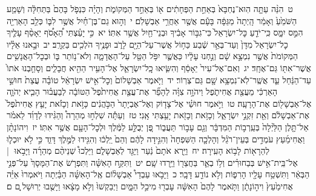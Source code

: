 \documentclass[18pt]{article}
\newcommand{\kri}[1]{\Afootnote{#1}}	%
\begin{document}
 {\loc ט~}הִנֵּ֨ה עַתָּ֤ה הֽוּא־נֶחְבָּא֙ בְּאַחַ֣ת הַפְּחָתִ֔ים א֖וֹ בְּאַחַ֣ד הַמְּקוֹמֹ֑ת וְהָיָ֗ה כִּנְפֹ֤ל בָּהֶם֙ בַּתְּחִלָּ֔ה וְשָׁמַ֤ע הַשֹּׁמֵ֙עַ֙ וְאָמַ֔ר הָֽיְתָה֙ מַגֵּפָ֔ה בָּעָ֕ם אֲשֶׁ֖ר אַחֲרֵ֥י אַבְשָׁלֹֽם׃ \startlock
 {\loc י~}וְה֣וּא גַם־בֶּן־חַ֗יִל אֲשֶׁ֥ר לִבּ֛וֹ כְּלֵ֥ב הָאַרְיֵ֖ה הִמֵּ֣ס יִמָּ֑ס כִּֽי־יֹדֵ֤עַ כׇּל־יִשְׂרָאֵל֙ כִּי־גִבּ֣וֹר אָבִ֔יךָ וּבְנֵי־חַ֖יִל אֲשֶׁ֥ר אִתּֽוֹ׃ \startlock
 {\loc יא~}כִּ֣י יָעַ֗צְתִּי הֵ֠אָסֹ֠ף יֵאָסֵ֨ף עָלֶ֤יךָ כׇל־יִשְׂרָאֵל֙ מִדָּן֙ וְעַד־בְּאֵ֣ר שֶׁ֔בַע כַּח֥וֹל אֲשֶׁר־עַל־הַיָּ֖ם לָרֹ֑ב וּפָנֶ֥יךָ הֹלְכִ֖ים בַּקְרָֽב׃ \startlock
 {\loc יב~}וּבָ֣אנוּ אֵלָ֗יו  \edtext{(באחת)}{\kri{קרי: בְּאַחַ֤ד}}  הַמְּקוֹמֹת֙ אֲשֶׁ֣ר נִמְצָ֣א שָׁ֔ם וְנַ֣חְנוּ עָלָ֔יו כַּאֲשֶׁ֛ר יִפֹּ֥ל הַטַּ֖ל עַל־הָאֲדָמָ֑ה וְלֹא־נ֥וֹתַר בּ֛וֹ וּבְכׇל־הָאֲנָשִׁ֥ים אֲשֶׁר־אִתּ֖וֹ גַּם־אֶחָֽד׃ \startlock
 {\loc יג~}וְאִם־אֶל־עִיר֙ יֵאָסֵ֔ף וְהִשִּׂ֧יאוּ כׇֽל־יִשְׂרָאֵ֛ל אֶל־הָעִ֥יר הַהִ֖יא חֲבָלִ֑ים וְסָחַ֤בְנוּ אֹתוֹ֙ עַד־הַנַּ֔חַל עַ֛ד אֲשֶֽׁר־לֹֽא־נִמְצָ֥א שָׁ֖ם גַּם־צְרֽוֹר׃ \startlock
 {\loc יד~}וַיֹּ֤אמֶר אַבְשָׁלוֹם֙ וְכׇל־אִ֣ישׁ יִשְׂרָאֵ֔ל טוֹבָ֗ה עֲצַת֙ חוּשַׁ֣י הָאַרְכִּ֔י מֵעֲצַ֖ת אֲחִיתֹ֑פֶל \edtext{{ס}    }{\kri{פסקא באמצע פסוק}שמואל ב יז יד} וַיהֹוָ֣ה צִוָּ֗ה לְהָפֵ֞ר אֶת־עֲצַ֤ת אֲחִיתֹ֙פֶל֙ הַטּוֹבָ֔ה לְבַעֲב֗וּר הָבִ֧יא יְהֹוָ֛ה אֶל־אַבְשָׁל֖וֹם אֶת־הָרָעָֽה׃ \startlock
 {\loc טו~}וַיֹּ֣אמֶר חוּשַׁ֗י אֶל־צָד֤וֹק וְאֶל־אֶבְיָתָר֙ הַכֹּ֣הֲנִ֔ים כָּזֹ֣את וְכָזֹ֗את יָעַ֤ץ אֲחִיתֹ֙פֶל֙ אֶת־אַבְשָׁלֹ֔ם וְאֵ֖ת זִקְנֵ֣י יִשְׂרָאֵ֑ל וְכָזֹ֥את וְכָזֹ֖את יָעַ֥צְתִּי אָֽנִי׃ \startlock
 {\loc טז~}וְעַתָּ֡ה שִׁלְח֣וּ מְהֵרָה֩ וְהַגִּ֨ידוּ לְדָוִ֜ד לֵאמֹ֗ר אַל־תָּ֤לֶן הַלַּ֙יְלָה֙ בְּעַֽרְב֣וֹת הַמִּדְבָּ֔ר וְגַ֖ם עָב֣וֹר תַּעֲב֑וֹר פֶּ֚ן יְבֻלַּ֣ע לַמֶּ֔לֶךְ וּלְכׇל־הָעָ֖ם אֲשֶׁ֥ר אִתּֽוֹ׃ \startlock
 {\loc יז~}וִיהוֹנָתָ֨ן וַאֲחִימַ֜עַץ עֹמְדִ֣ים בְּעֵין־רֹגֵ֗ל וְהָלְכָ֤ה הַשִּׁפְחָה֙ וְהִגִּ֣ידָה לָהֶ֔ם וְהֵם֙ יֵֽלְכ֔וּ וְהִגִּ֖ידוּ לַמֶּ֣לֶךְ דָּוִ֑ד כִּ֣י לֹ֥א יוּכְל֛וּ לְהֵרָא֖וֹת לָב֥וֹא הָעִֽירָה׃ \startlock
 {\loc יח~}וַיַּ֤רְא אֹתָם֙ נַ֔עַר וַיַּגֵּ֖ד לְאַבְשָׁלֹ֑ם וַיֵּלְכוּ֩ שְׁנֵיהֶ֨ם מְהֵרָ֜ה וַיָּבֹ֣אוּ  |  אֶל־בֵּֽית־אִ֣ישׁ בְּבַחוּרִ֗ים וְל֥וֹ בְאֵ֛ר בַּחֲצֵר֖וֹ וַיֵּ֥רְדוּ שָֽׁם׃ \startlock
 {\loc יט~}וַתִּקַּ֣ח הָאִשָּׁ֗ה וַתִּפְרֹ֤שׂ אֶת־הַמָּסָךְ֙ עַל־פְּנֵ֣י הַבְּאֵ֔ר וַתִּשְׁטַ֥ח עָלָ֖יו הָרִפ֑וֹת וְלֹ֥א נוֹדַ֖ע דָּבָֽר׃ \startlock
 {\loc כ~}וַיָּבֹ֣אוּ עַבְדֵי֩ אַבְשָׁל֨וֹם אֶֽל־הָאִשָּׁ֜ה הַבַּ֗יְתָה וַיֹּאמְרוּ֙ אַיֵּ֗ה אֲחִימַ֙עַץ֙ וִיה֣וֹנָתָ֔ן וַתֹּ֤אמֶר לָהֶם֙ הָאִשָּׁ֔ה עָבְר֖וּ מִיכַ֣ל הַמָּ֑יִם וַיְבַקְשׁוּ֙ וְלֹ֣א מָצָ֔אוּ וַיָּשֻׁ֖בוּ יְרֽוּשָׁל ָֽ͏ְם ם׃ \startlock
\end{document}
